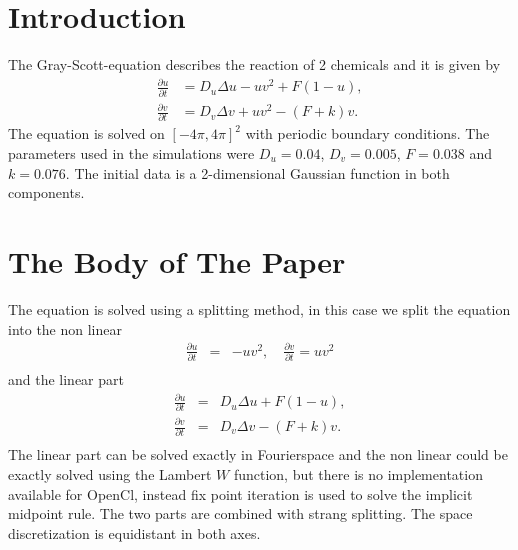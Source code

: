 \documentclass{sig-alternate-05-2015}
\begin{document}


%
%

%
%
\printccsdesc



\section{Introduction}
The Gray-Scott-equation\cite{grayscott} describes the reaction of 2 chemicals and it is given by 
\vspace{1mm}
\begin{align*}
\frac{\partial u}{\partial t}&= D_u\Delta u-uv^2+F(1-u),\\
\frac{\partial v}{\partial t}&= D_v\Delta v+uv^2-(F+k)v.
\end{align*}
\vspace{-1.75mm}$~$\\
The equation is solved on $[-4\pi,4\pi]^2$ with periodic boundary conditions.
The parameters used in the simulations were $D_u=0.04$, $D_v=0.005$, $F=0.038$ and $k=0.076$. The initial data is a 2-dimensional Gaussian function in both components.

\section{The {\secit Body} of The Paper}
The equation is solved using a splitting method, in this case we split the equation into the non linear 
\begin{eqnarray*}
\frac{\partial u}{\partial t}&=& -uv^2 ,\quad \frac{\partial v}{\partial t}=uv^2 \\
\end{eqnarray*}
and the linear part
\begin{eqnarray*}
\frac{\partial u}{\partial t}&=& D_u\Delta u+F(1-u), \\
\frac{\partial v}{\partial t}&=& D_v\Delta v-(F+k)v. \\
 \end{eqnarray*} 
 The linear part can be solved exactly in Fourierspace and the non linear could be exactly solved using the Lambert $W$ function, but there is no implementation available for OpenCl, instead fix point iteration is used to solve the implicit midpoint rule. The two parts are combined with strang splitting. The space discretization is equidistant in both axes.
\end{document}
